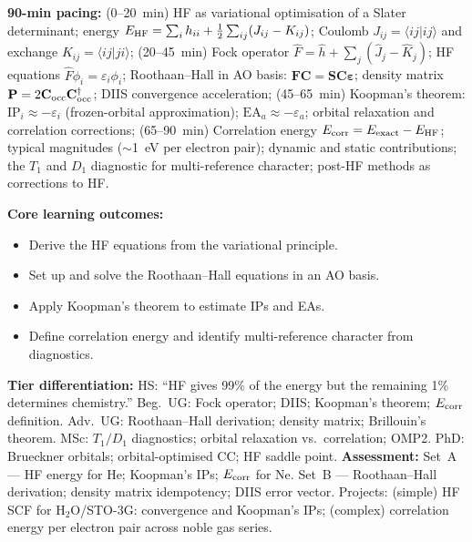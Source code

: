 \documentclass[11pt,a4paper]{article}
\begin{document}
\begin{tcolorbox}[chembox, title={Module~III.2 / L10: Hartree--Fock Theory, Koopman's Theorem, and Correlation Energy}]
\textbf{90-min pacing:} (0--20~min) HF as variational optimisation of a Slater determinant; energy $E_{\rm HF}=\sum_i h_{ii}+\tfrac{1}{2}\sum_{ij}(J_{ij}-K_{ij})$; Coulomb $J_{ij}=\langle ij|ij\rangle$ and exchange $K_{ij}=\langle ij|ji\rangle$; (20--45~min) Fock operator $\hat{F}=\hat{h}+\sum_j(\hat{J}_j-\hat{K}_j)$; HF equations $\hat{F}\phi_i=\varepsilon_i\phi_i$; Roothaan--Hall in AO basis: $\mathbf{F}\mathbf{C}=\mathbf{S}\mathbf{C}\boldsymbol\varepsilon$; density matrix $\mathbf{P}=2\mathbf{C}_{\rm occ}\mathbf{C}_{\rm occ}^\dagger$; DIIS convergence acceleration; (45--65~min) Koopman's theorem: $\text{IP}_i\approx-\varepsilon_i$ (frozen-orbital approximation); $\text{EA}_a\approx-\varepsilon_a$; orbital relaxation and correlation corrections; (65--90~min) Correlation energy $E_{\rm corr}=E_{\rm exact}-E_{\rm HF}$; typical magnitudes ($\sim$1~eV per electron pair); dynamic and static contributions; the $T_1$ and $D_1$ diagnostic for multi-reference character; post-HF methods as corrections to HF.

\medskip\textbf{Core learning outcomes:}
\begin{itemize}[leftmargin=1.4em,topsep=2pt,itemsep=1pt]
  \item Derive the HF equations from the variational principle.
  \item Set up and solve the Roothaan--Hall equations in an AO basis.
  \item Apply Koopman's theorem to estimate IPs and EAs.
  \item Define correlation energy and identify multi-reference character from diagnostics.
\end{itemize}
\medskip\textbf{Tier differentiation:}
HS: ``HF gives 99\% of the energy but the remaining 1\% determines chemistry.''
Beg.\ UG: Fock operator; DIIS; Koopman's theorem; $E_{\rm corr}$ definition.
Adv.\ UG: Roothaan--Hall derivation; density matrix; Brillouin's theorem.
MSc: $T_1/D_1$ diagnostics; orbital relaxation vs.\ correlation; OMP2.
PhD: Brueckner orbitals; orbital-optimised CC; HF saddle point.
\medskip\textbf{Assessment:}
Set~A --- HF energy for He; Koopman's IPs; $E_{\rm corr}$ for Ne.
Set~B --- Roothaan--Hall derivation; density matrix idempotency; DIIS error vector.
Projects: (simple) HF SCF for H$_2$O/STO-3G: convergence and Koopman's IPs; (complex) correlation energy per electron pair across noble gas series.
\end{tcolorbox}
\end{document}
